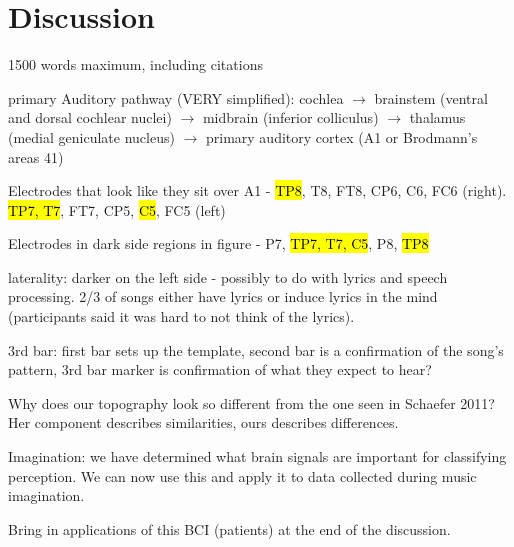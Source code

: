 \chapter*{Discussion}
1500 words maximum, including citations

primary Auditory pathway (VERY simplified): cochlea $\rightarrow$ brainstem (ventral and dorsal cochlear nuclei) $\rightarrow$ midbrain (inferior colliculus) $\rightarrow$ thalamus (medial geniculate nucleus) $\rightarrow$ primary auditory cortex (A1 or Brodmann's areas 41)

Electrodes that look like they sit over A1 - \hl{TP8}, T8, FT8, CP6, C6, FC6 (right). \hl{TP7, T7}, FT7, CP5, \hl{C5}, FC5 (left)

Electrodes in dark side regions in figure - P7, \hl{TP7, T7, C5}, P8, \hl{TP8}

laterality: darker on the left side - possibly to do with lyrics and speech processing. 2/3 of songs either have lyrics or induce lyrics in the mind (participants said it was hard to not think of the lyrics). 

3rd bar: first bar sets up the template, second bar is a confirmation of the song's pattern, 3rd bar marker is confirmation of what they expect to hear? 

Why does our topography look so different from the one seen in Schaefer 2011? Her component describes similarities, ours describes differences. 

Imagination: we have determined what brain signals are important for classifying perception. We can now use this and apply it to data collected during music imagination.

Bring in applications of this BCI (patients) at the end of the discussion.